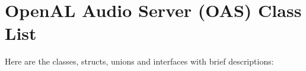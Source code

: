 \section{Open\-AL Audio Server (OAS) Class List}
Here are the classes, structs, unions and interfaces with brief descriptions:\begin{CompactList}
\item{}
\item{}
\end{CompactList}
